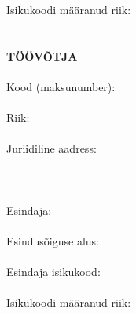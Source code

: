 \begin{Form}
\begin{paracol}{3}
{        Isikukoodi määranud riik:\\
        \\
        \\
        \textbf{TÖÖVÕTJA}\\
        \\
        Kood (maksunumber):\\
        \\
        Riik:\\
        \\
        Juriidiline aadress:\\
        \\
        \\
        \\
        Esindaja:\\
        \\
        Esindusõiguse alus:\\
        \\
        Esindaja isikukood:\\
        \\
        Isikukoodi määranud riik:\\
        \\}
    \end{paracol}
  \appendix
  
  
  
  \end{Form}

